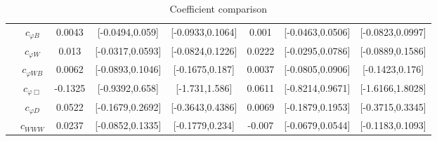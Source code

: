 \documentclass{article}
\begin{document}
\begin{table}[H]
\begin{tabular}{|c|c|c|c|c|c|c|c|}
 & $c_{\varphi B}$ & 0.0043                             & [-0.0494,0.059]                                 & [-0.0933,0.1064] & 0.001                             & [-0.0463,0.0506]                                 & [-0.0823,0.0997] \\ \cline{2-8}
 & $c_{\varphi W}$ & 0.013                             & [-0.0317,0.0593]                                 & [-0.0824,0.1226] & 0.0222                             & [-0.0295,0.0786]                                 & [-0.0889,0.1586] \\ \cline{2-8}
 & $c_{\varphi WB}$ & 0.0062                             & [-0.0893,0.1046]                                 & [-0.1675,0.187] & 0.0037                             & [-0.0805,0.0906]                                 & [-0.1423,0.176] \\ \cline{2-8}
 & $c_{\varphi \Box}$ & -0.1325                             & [-0.9392,0.658]                                 & [-1.731,1.586] & 0.0611                             & [-0.8214,0.9671]                                 & [-1.6166,1.8028] \\ \cline{2-8}
 & $c_{\varphi D}$ & 0.0522                             & [-0.1679,0.2692]                                 & [-0.3643,0.4386] & 0.0069                             & [-0.1879,0.1953]                                 & [-0.3715,0.3345] \\ \cline{2-8}
 & $c_{WWW}$ & 0.0237                             & [-0.0852,0.1335]                                 & [-0.1779,0.234] & -0.007                             & [-0.0679,0.0544]                                 & [-0.1183,0.1093] \\ \cline{2-8}
\hline
\end{tabular}
\caption{Coefficient comparison}
\end{table}
\end{document}
